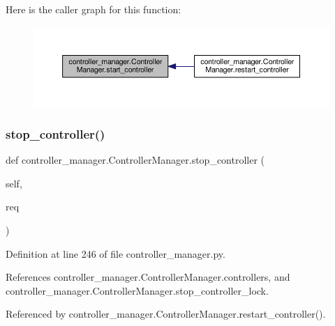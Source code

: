 Here is the caller graph for this function\+:
\nopagebreak
\begin{figure}[H]
\begin{center}
\leavevmode
\includegraphics[width=350pt]{dd/da8/classcontroller__manager_1_1_controller_manager_a4d92280a301d78500055ebccdaf14820_icgraph}
\end{center}
\end{figure}
\mbox{\label{classcontroller__manager_1_1_controller_manager_a54e01b56f67af0b1434c53b1c0abe7ef}} 
\subsubsection{\texorpdfstring{stop\+\_\+controller()}{stop\_controller()}}
{\footnotesize\ttfamily def controller\+\_\+manager.\+Controller\+Manager.\+stop\+\_\+controller (\begin{DoxyParamCaption}\item[{}]{self,  }\item[{}]{req }\end{DoxyParamCaption})}



Definition at line 246 of file controller\+\_\+manager.\+py.



References controller\+\_\+manager.\+Controller\+Manager.\+controllers, and controller\+\_\+manager.\+Controller\+Manager.\+stop\+\_\+controller\+\_\+lock.



Referenced by controller\+\_\+manager.\+Controller\+Manager.\+restart\+\_\+controller().


